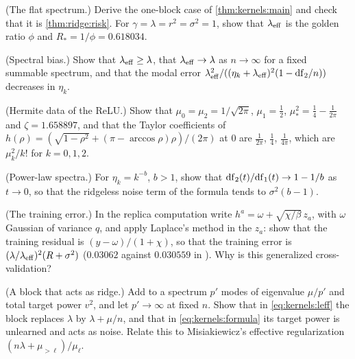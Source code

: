 \begin{refsection}
\begin{exercises}
\item \consolidation (The flat spectrum.) Derive the one-block case of \cref{thm:kernels:main} and check that it is \cref{thm:ridge:risk}. For $\gamma=\lambda=r^2=\sigma^2=1$, show that $\lambda_{\mathrm{eff}}$ is the golden ratio $\phi$ and $R_*=1/\phi=0.618034$.\label{ex:kernels:flat}

\item \consolidation (Spectral bias.) Show that $\lambda_{\mathrm{eff}}\ge\lambda$, that $\lambda_{\mathrm{eff}}\to\lambda$ as $n\to\infty$ for a fixed summable spectrum, and that the modal error $\lambda_{\mathrm{eff}}^2/((\eta_k+\lambda_{\mathrm{eff}})^2(1-\mathrm{df}_2/n))$ decreases in $\eta_k$.

\item \consolidation (Hermite data of the ReLU.) Show that $\mu_0=\mu_2=1/\sqrt{2\pi}$, $\mu_1=\frac12$, $\mu_*^2=\frac14-\frac1{2\pi}$ and $\zeta=1.658897$, and that the Taylor coefficients of $h(\rho)=(\sqrt{1-\rho^2}+(\pi-\arccos\rho)\rho)/(2\pi)$ at $0$ are $\frac1{2\pi}$, $\frac14$, $\frac1{4\pi}$, which are $\mu_k^2/k!$ for $k=0,1,2$.

\item \consolidation (Power-law spectra.) For $\eta_k=k^{-b}$, $b>1$, show that $\mathrm{df}_2(t)/\mathrm{df}_1(t)\to1-1/b$ as $t\to0$, so that the ridgeless noise term of the formula tends to $\sigma^2(b-1)$. \label{ex:kernels:powerlaw}

\item \byhand (The training error.) In the replica computation write $h^a=\omega+\sqrt{\chi/\beta}\,z_a$, with $\omega$ Gaussian of variance $q$, and apply Laplace's method in the $z_a$: show that the training residual is $(y-\omega)/(1+\chi)$, so that the training error is $(\lambda/\lambda_{\mathrm{eff}})^2(R+\sigma^2)$ ($0.03062$ against $0.030559$ in ). Why is this generalized cross-validation?\label{ex:kernels:gcv}

\item \byhand (A block that acts as ridge.) Add to a spectrum $p'$ modes of eigenvalue $\mu/p'$ and total target power $v^2$, and let $p'\to\infty$ at fixed $n$. Show that in \eqref{eq:kernels:leff} the block replaces $\lambda$ by $\lambda+\mu/n$, and that in \eqref{eq:kernels:formula} its target power is unlearned and acts as noise. Relate this to Misiakiewicz's effective regularization $(n\lambda+\mu_{>\ell})/\mu_\ell$.\label{ex:kernels:block}


\end{exercises}
\end{refsection}

